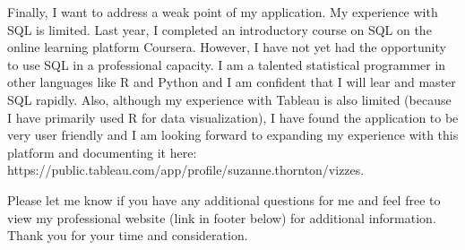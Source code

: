 \documentclass[11pt,a4paper,sans]{moderncv}
\begin{document}
	Finally, I want to address a weak point of my application. My experience with SQL is limited. Last year, I completed an introductory course on SQL on the online learning platform Coursera. However, I have not yet had the opportunity to use SQL in a professional capacity. I am a talented statistical programmer in other languages like R and Python and I am confident that I will lear and master SQL rapidly. Also, although my experience with Tableau is also limited (because I have primarily used R for data visualization), I have found the application to be very user friendly and I am looking forward to expanding my experience with this platform and documenting it here: https://public.tableau.com/app/profile/suzanne.thornton/vizzes. 
	
	
	Please let me know if you have any additional questions for me and feel free to view my professional website (link in footer below) for additional information. Thank you for your time and consideration.\\
	
	\vspace{3mm}
	
	\makeletterclosing
	
\end{document}
